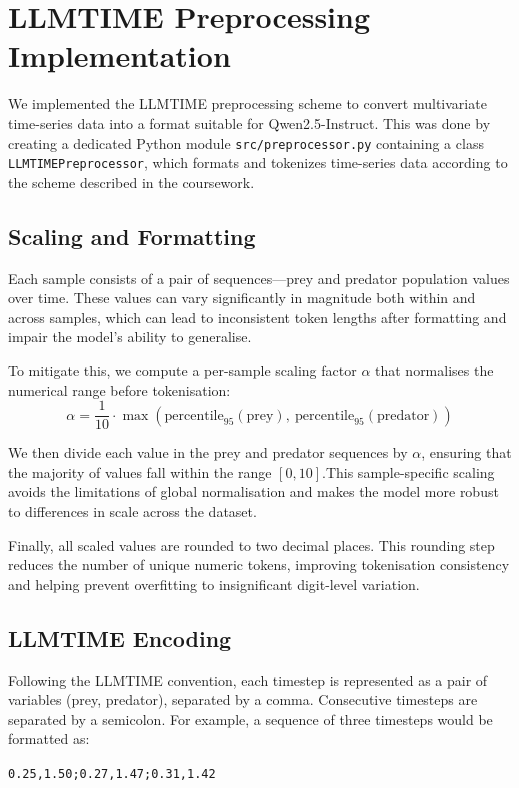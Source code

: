\documentclass[a4paper,12pt]{article}
\begin{document}
\section{LLMTIME Preprocessing Implementation}

We implemented the LLMTIME preprocessing scheme \citep{gruver2023language} to convert multivariate time-series data into a format suitable for Qwen2.5-Instruct. This was done by creating a dedicated Python module \texttt{src/preprocessor.py} containing a class \texttt{LLMTIMEPreprocessor}, which formats and tokenizes time-series data according to the scheme described in the coursework.

\subsection*{Scaling and Formatting}

Each sample consists of a pair of sequences—prey and predator population values over time. These values can vary significantly in magnitude both within and across samples, which can lead to inconsistent token lengths after formatting and impair the model’s ability to generalise.

To mitigate this, we compute a per-sample scaling factor $\alpha$ that normalises the numerical range before tokenisation:
\begin{equation}
\alpha = \frac{1}{10} \cdot \max\left(\text{percentile}_{95}(\text{prey}),\ \text{percentile}_{95}(\text{predator})\right)
\end{equation}

We then divide each value in the prey and predator sequences by $\alpha$, ensuring that the majority of values fall within the range $[0, 10]$.This sample-specific scaling avoids the limitations of global normalisation and makes the model more robust to differences in scale across the dataset.

Finally, all scaled values are rounded to two decimal places. This rounding step reduces the number of unique numeric tokens, improving tokenisation consistency and helping prevent overfitting to insignificant digit-level variation.


\subsection*{LLMTIME Encoding}

Following the LLMTIME convention, each timestep is represented as a pair of variables (prey, predator), separated by a comma. Consecutive timesteps are separated by a semicolon. For example, a sequence of three timesteps would be formatted as:
\begin{center}
\texttt{0.25,1.50;0.27,1.47;0.31,1.42}
\end{center}
\end{document}
